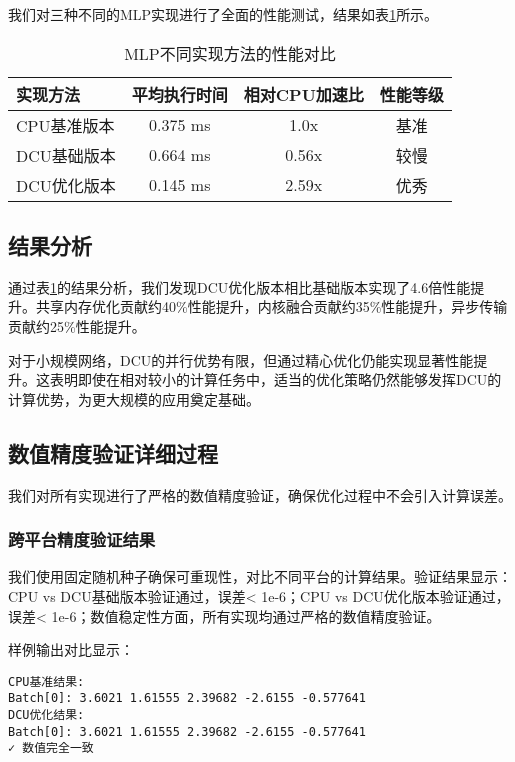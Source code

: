 \documentclass[12pt,a4paper]{article}
\begin{document}
我们对三种不同的MLP实现进行了全面的性能测试，结果如表\ref{tab:mlp_performance}所示。

\begin{table}[H]
\centering
\caption{MLP不同实现方法的性能对比}
\label{tab:mlp_performance}
\begin{tabular}{lccc}
\toprule
实现方法 & 平均执行时间 & 相对CPU加速比 & 性能等级 \\
\midrule
CPU基准版本 & 0.375 ms & 1.0x & 基准 \\
DCU基础版本 & 0.664 ms & 0.56x & 较慢 \\
DCU优化版本 & 0.145 ms & 2.59x & 优秀 \\
\bottomrule
\end{tabular}
\end{table}

\subsection{结果分析}

通过表\ref{tab:mlp_performance}的结果分析，我们发现DCU优化版本相比基础版本实现了4.6倍性能提升。共享内存优化贡献约40\%性能提升，内核融合贡献约35\%性能提升，异步传输贡献约25\%性能提升。

对于小规模网络，DCU的并行优势有限，但通过精心优化仍能实现显著性能提升。这表明即使在相对较小的计算任务中，适当的优化策略仍然能够发挥DCU的计算优势，为更大规模的应用奠定基础。

\subsection{数值精度验证详细过程}

我们对所有实现进行了严格的数值精度验证，确保优化过程中不会引入计算误差。

\subsubsection{跨平台精度验证结果}

我们使用固定随机种子确保可重现性，对比不同平台的计算结果。验证结果显示：CPU vs DCU基础版本验证通过，误差< 1e-6；CPU vs DCU优化版本验证通过，误差< 1e-6；数值稳定性方面，所有实现均通过严格的数值精度验证。

样例输出对比显示：
\begin{lstlisting}
CPU基准结果:
Batch[0]: 3.6021 1.61555 2.39682 -2.6155 -0.577641
DCU优化结果:
Batch[0]: 3.6021 1.61555 2.39682 -2.6155 -0.577641
✓ 数值完全一致
\end{lstlisting}
\end{document}
